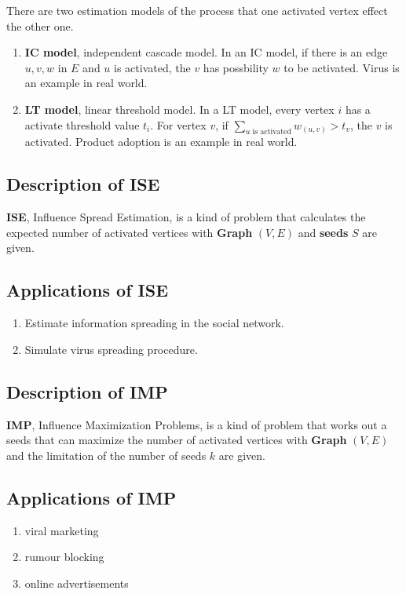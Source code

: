 \documentclass[lang=en,12pt]{elegantpaper}
\begin{document}
There are two estimation models of the process that one activated vertex effect the other one.

\begin{enumerate}
  \item \textbf{IC model}, independent cascade model. In an IC model, if there is an edge $u, v, w$ in $E$ and $u$ is activated, the $v$ has possbility $w$ to be activated.\cite{survey}
  Virus is an example in real world.
  \item \textbf{LT model}, linear threshold model. In a LT model, every vertex $i$ has a activate threshold value $t_i$. For vertex $v$, if $\sum_{u \text{ is activated}} w_{(u, v)} > t_{v}$, the $v$ is activated.\cite{survey}
  Product adoption is an example in real world.
\end{enumerate}

\subsection{Description of ISE}
\textbf{ISE}, Influence Spread Estimation, is a kind of problem that calculates the expected number of activated vertices with \textbf{Graph} $(V, E)$  and \textbf{seeds} $S$ are given.

\subsection{Applications of ISE}

\begin{enumerate}
  \item Estimate information spreading in the social network.
  \item Simulate virus spreading procedure.
\end{enumerate}

\subsection{Description of IMP}
\textbf{IMP}, Influence Maximization Problems, is a kind of problem that works out a seeds that can maximize the number of activated vertices with \textbf{Graph} $(V, E)$ and the limitation of the number of seeds $k$ are given.


\subsection{Applications of IMP}
\begin{enumerate}
  \item viral marketing
  \item rumour blocking
  \item online advertisements
\end{enumerate}
\end{document}
